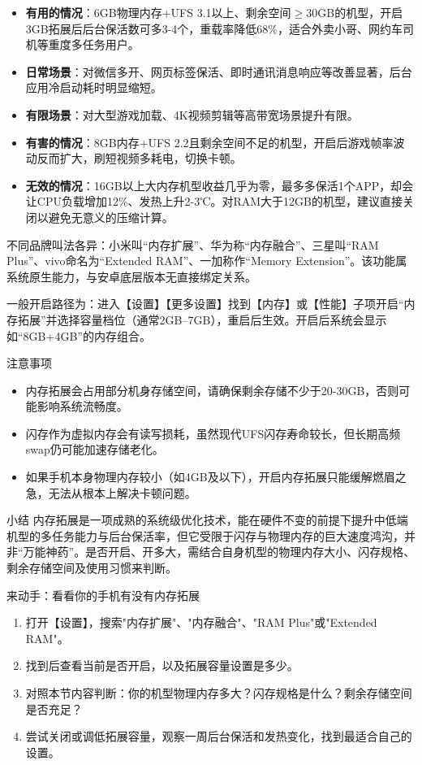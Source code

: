 \begin{itemize}
  \item \textbf{有用的情况}：6GB物理内存+UFS 3.1以上、剩余空间$\geq$30GB的机型，开启3GB拓展后后台保活数可多3-4个，重载率降低68\%，适合外卖小哥、网约车司机等重度多任务用户。
  \item \textbf{日常场景}：对微信多开、网页标签保活、即时通讯消息响应等改善显著，后台应用冷启动耗时明显缩短。
  \item \textbf{有限场景}：对大型游戏加载、4K视频剪辑等高带宽场景提升有限。
  \item \textbf{有害的情况}：8GB内存+UFS 2.2且剩余空间不足的机型，开启后游戏帧率波动反而扩大，刷短视频多耗电，切换卡顿。
  \item \textbf{无效的情况}：16GB以上大内存机型收益几乎为零，最多多保活1个APP，却会让CPU负载增加12\%、发热上升2-3℃。对RAM大于12GB的机型，建议直接关闭以避免无意义的压缩计算。
\end{itemize}


不同品牌叫法各异：小米叫“内存扩展”、华为称“内存融合”、三星叫“RAM Plus”、vivo命名为“Extended RAM”、一加称作“Memory Extension”。该功能属系统原生能力，与安卓底层版本无直接绑定关系。

一般开启路径为：进入【设置】【更多设置】找到【内存】或【性能】子项开启“内存拓展”并选择容量档位（通常2GB–7GB），重启后生效。开启后系统会显示如“8GB+4GB”的内存组合。

\begin{tcbwarn}{注意事项}
\begin{itemize}
  \item 内存拓展会占用部分机身存储空间，请确保剩余存储不少于20-30GB，否则可能影响系统流畅度。
  \item 闪存作为虚拟内存会有读写损耗，虽然现代UFS闪存寿命较长，但长期高频swap仍可能加速存储老化。
  \item 如果手机本身物理内存较小（如4GB及以下），开启内存拓展只能缓解燃眉之急，无法从根本上解决卡顿问题。
\end{itemize}

\end{tcbwarn}

\begin{tcbinfo}{小结}
内存拓展是一项成熟的系统级优化技术，能在硬件不变的前提下提升中低端机型的多任务能力与后台保活率，但它受限于闪存与物理内存的巨大速度鸿沟，并非“万能神药”。是否开启、开多大，需结合自身机型的物理内存大小、闪存规格、剩余存储空间及使用习惯来判断。

\end{tcbinfo}

\begin{tcbpractice}{来动手：看看你的手机有没有内存拓展}
\begin{enumerate}
  \item 打开【设置】，搜索"内存扩展"、"内存融合"、"RAM Plus"或"Extended RAM"。
  \item 找到后查看当前是否开启，以及拓展容量设置是多少。
  \item 对照本节内容判断：你的机型物理内存多大？闪存规格是什么？剩余存储空间是否充足？
  \item 尝试关闭或调低拓展容量，观察一周后台保活和发热变化，找到最适合自己的设置。
\end{enumerate}

\end{tcbpractice}
